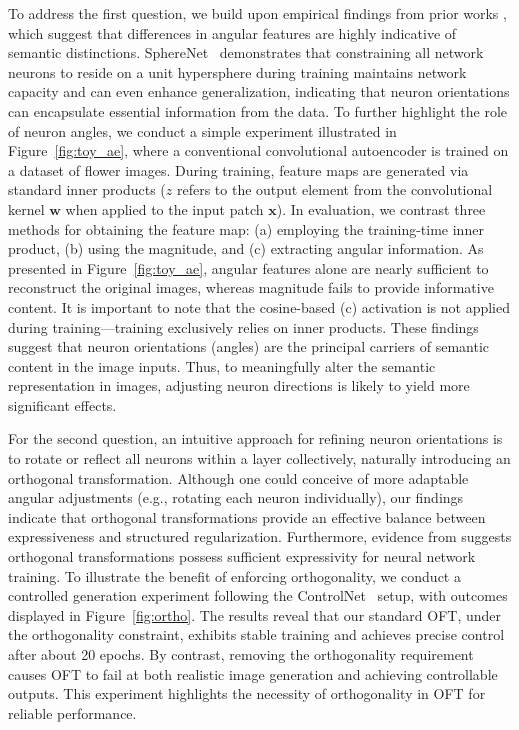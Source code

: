 To address the first question, we build upon empirical findings from prior works \cite{liu2018decoupled,chen2020angular}, which suggest that differences in angular features are highly indicative of semantic distinctions. SphereNet~\cite{liu2017deep} demonstrates that constraining all network neurons to reside on a unit hypersphere during training maintains network capacity and can even enhance generalization, indicating that neuron orientations can encapsulate essential information from the data. To further highlight the role of neuron angles, we conduct a simple experiment illustrated in Figure~\ref{fig:toy_ae}, where a conventional convolutional autoencoder is trained on a dataset of flower images. During training, feature maps are generated via standard inner products ($z$ refers to the output element from the convolutional kernel $\bm{w}$ when applied to the input patch $\bm{x}$). In evaluation, we contrast three methods for obtaining the feature map: (a) employing the training-time inner product, (b) using the magnitude, and (c) extracting angular information. As presented in Figure~\ref{fig:toy_ae}, angular features alone are nearly sufficient to reconstruct the original images, whereas magnitude fails to provide informative content. It is important to note that the cosine-based (c) activation is not applied during training—training exclusively relies on inner products. These findings suggest that neuron orientations (angles) are the principal carriers of semantic content in the image inputs. Thus, to meaningfully alter the semantic representation in images, adjusting neuron directions is likely to yield more significant effects.

For the second question, an intuitive approach for refining neuron orientations is to rotate or reflect all neurons within a layer collectively, naturally introducing an orthogonal transformation. Although one could conceive of more adaptable angular adjustments (e.g., rotating each neuron individually), our findings indicate that orthogonal transformations provide an effective balance between expressiveness and structured regularization. Furthermore, evidence from \cite{liu2021orthogonal} suggests orthogonal transformations possess sufficient expressivity for neural network training. To illustrate the benefit of enforcing orthogonality, we conduct a controlled generation experiment following the ControlNet~\cite{zhang2023adding} setup, with outcomes displayed in Figure~\ref{fig:ortho}. The results reveal that our standard OFT, under the orthogonality constraint, exhibits stable training and achieves precise control after about 20 epochs. By contrast, removing the orthogonality requirement causes OFT to fail at both realistic image generation and achieving controllable outputs. This experiment highlights the necessity of orthogonality in OFT for reliable performance.

